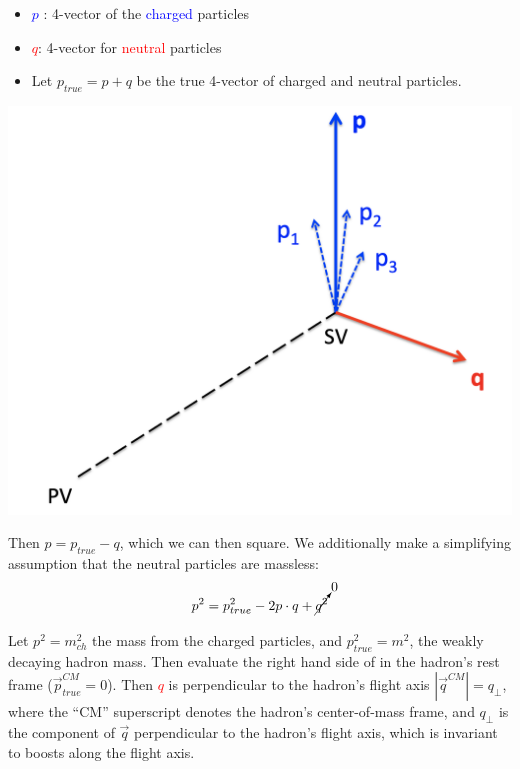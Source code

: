 \begin{minipage}{0.6\textwidth}
\begin{itemize}
	\item \textcolor{blue}{$p$}	: 4-vector of the \textcolor{blue}{charged} particles
	\item \textcolor{red}{$q$}: 4-vector for \textcolor{red}{neutral} particles
	\item Let $p_{true} = p + q$ be the true 4-vector of charged and neutral particles. 
\end{itemize}

\hspace{0.03\textwidth}
\end{minipage}
\begin{minipage}{0.35\textwidth}
\includegraphics[width=\textwidth]{figures/ftag/mass-regression/mass-pt-constraint}
\end{minipage}

Then $p = p_{true} -q$, which we can then square. We additionally make a simplifying assumption that the neutral particles are massless:
\begin{equation}
p^2 = p_{true}^2 - 2 p \cdot q + \cancelto{0}{q^2}
\label{eq:chg-neutral}
\end{equation}

Let $p^2 = m_{ch}^2$ the mass from the charged particles, and $p_{true}^2 = m^2$, the weakly decaying hadron mass. 
Then evaluate the right hand side of \Eq{\ref{eq:chg-neutral}} in the hadron's rest frame ($\vec{p}_{true}^{CM} = 0$).  Then \textcolor{red}{$q$} is perpendicular to the hadron's flight axis $|\vec{q}^{CM}| = q_\perp$, where the ``CM'' superscript denotes the hadron's center-of-mass frame, and $q_\perp$ is the component of $\vec{q}$ perpendicular to the hadron's flight axis, which is invariant to boosts along the flight axis.

